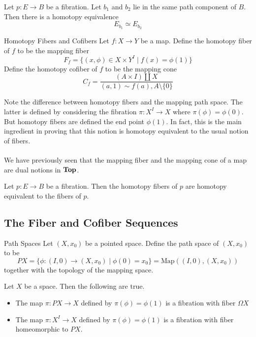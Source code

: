 \documentclass[a4paper]{article}
\begin{document}
\begin{prp}{}{} Let $p:E\to B$ be a fibration. Let $b_1$ and $b_2$ lie in the same path component of $B$. Then there is a homotopy equivalence $$E_{b_1}\simeq E_{b_2}$$
\end{prp}

\begin{defn}{Homotopy Fibers and Cofibers}{} Let $f:X\to Y$ be a map. Define the homotopy fiber of $f$ to be the mapping fiber $$F_f=\{(x,\phi)\in X\times Y^I\;|\;f(x)=\phi(1)\}$$ Define the homotopy cofiber of $f$ to be the mapping cone $$C_f=\frac{(A\times I)\amalg X}{(a,1)\sim f(a),A\setminus\{0\}}$$
\end{defn}

Note the difference between homotopy fibers and the mapping path space. The latter is defined by considering the fibration $\pi:X^I\to X$ where $\pi(\phi)=\phi(0)$. But homotopy fibers are defined the end point $\phi(1)$. In fact, this is the main ingredient in proving that this notion is homotopy equivalent to the usual notion of fibers. \\~\\

We have previously seen that the mapping fiber and the mapping cone of a map are dual notions in $\bold{Top}$. 

\begin{prp}{}{} Let $p:E\to B$ be a fibration. Then the homotopy fibers of $p$ are homotopy equivalent to the fibers of $p$. 
\end{prp}

\subsection{The Fiber and Cofiber Sequences}
\begin{defn}{Path Spaces}{} Let $(X,x_0)$ be a pointed space. Define the path space of $(X,x_0)$ to be $$PX=\{\phi:(I,0)\to(X,x_0)\;|\;\phi(0)=x_0\}=\text{Map}((I,0),(X,x_0))$$ together with the topology of the mapping space. 
\end{defn}

\begin{thm}{}{} Let $X$ be a space. Then the following are true. 
\begin{itemize}
\item The map $\pi:PX\to X$ defined by $\pi(\phi)=\phi(1)$ is a fibration with fiber $\Omega X$
\item The map $\pi:X^I\to X$ defined by $\pi(\phi)=\phi(1)$ is a fibration with fiber homeomorphic to $PX$. 
\end{itemize}
\end{thm}
\end{document}
